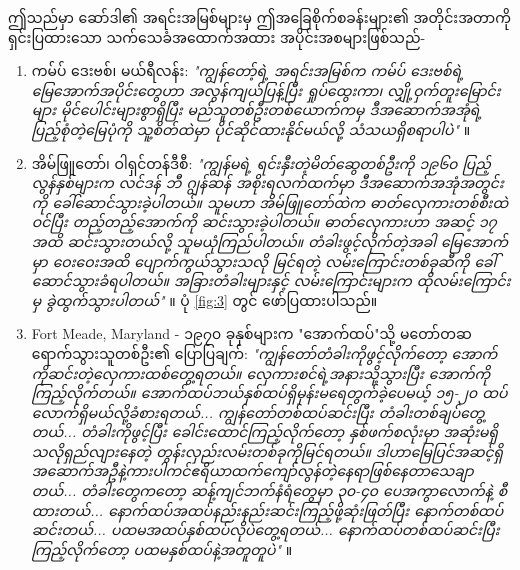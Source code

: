 \documentclass[10pt,twocolumn,letterpaper]{article}
\begin{document}
ဤသည်မှာ ဆော်ဒါ၏ အရင်းအမြစ်များမှ ဤအခြေစိုက်စခန်းများ၏ အတိုင်းအတာကို ရှင်းပြထားသော သက်သေခံအထောက်အထား အပိုင်းအစများဖြစ်သည်-
\begin{flushleft}
\begin{enumerate}
    \item ကမ်ပ် ဒေးဗစ်၊ မယ်ရီလန်း: \textit{"ကျွန်တော့်ရဲ့ အရင်းအမြစ်က ကမ်ပ် ဒေးဗစ်ရဲ့ မြေအောက်အပိုင်းတွေဟာ အလွန်ကျယ်ပြန့်ပြီး ရှုပ်ထွေးကာ၊ လျှို့ဝှက်တူးမြောင်းများ မိုင်ပေါင်းများစွာရှိပြီး မည်သူတစ်ဦးတစ်ယောက်ကမှ ဒီအဆောက်အအုံရဲ့ ပြည့်စုံတဲ့မြေပုံကို သူ့စိတ်ထဲမှာ ပိုင်ဆိုင်ထားနိုင်မယ်လို့ သံသယရှိစရာပါပဲ"} \cite{22}။
    \item အိမ်ဖြူတော်၊ ဝါရှင်တန်ဒီစီ: \textit{"ကျွန်မရဲ့ ရင်းနှီးတဲ့မိတ်ဆွေတစ်ဦးကို ၁၉၆၀ ပြည့်လွန်နှစ်များက လင်ဒန် ဘီ ဂျွန်ဆန် အစိုးရလက်ထက်မှာ ဒီအဆောက်အအုံအတွင်းကို ခေါ်ဆောင်သွားခဲ့ပါတယ်။ သူမဟာ အိမ်ဖြူတော်ထဲက ဓာတ်လှေကားတစ်စီးထဲဝင်ပြီး တည့်တည့်အောက်ကို ဆင်းသွားခဲ့ပါတယ်။ ဓာတ်လှေကားဟာ အဆင့် ၁၇ အထိ ဆင်းသွားတယ်လို့ သူမယုံကြည်ပါတယ်။ တံခါးဖွင့်လိုက်တဲ့အခါ မြေအောက်မှာ ဝေးဝေးအထိ ပျောက်ကွယ်သွားသလို မြင်ရတဲ့ လမ်းကြောင်းတစ်ခုဆီကို ခေါ်ဆောင်သွားခံရပါတယ်။ အခြားတံခါးများနှင့် လမ်းကြောင်းများက ထိုလမ်းကြောင်းမှ ခွဲထွက်သွားပါတယ်"} \cite{22}။ ပုံ \ref{fig:3} တွင် ဖော်ပြထားပါသည်။
    \item Fort Meade, Maryland - ၁၉၇၀ ခုနှစ်များက "အောက်ထပ်"သို့ မတော်တဆ ရောက်သွားသူတစ်ဦး၏ ပြောပြချက်: \textit{"ကျွန်တော်တံခါးကိုဖွင့်လိုက်တော့ အောက်ကိုဆင်းတဲ့လှေကားထစ်တွေ့ရတယ်။ လှေကားစင်ရဲ့အနားသို့သွားပြီး အောက်ကိုကြည့်လိုက်တယ်။ အောက်ထပ်ဘယ်နှစ်ထပ်ရှိမှန်းမရေတွက်ခဲ့ပေမယ့် ၁၅-၂၀ ထပ်လောက်ရှိမယ်လို့ခံစားရတယ်... ကျွန်တော်တစ်ထပ်ဆင်းပြီး တံခါးတစ်ချပ်တွေ့တယ်... တံခါးကိုဖွင့်ပြီး ခေါင်းထောင်ကြည့်လိုက်တော့ နှစ်ဖက်စလုံးမှာ အဆုံးမရှိသလိုရှည်လျားနေတဲ့ တွန်းလှည်းလမ်းတစ်ခုကိုမြင်ရတယ်။ ဒါဟာမြေပြင်အဆင့်ရှိ အဆောက်အဦနဲ့ကားပါကင်ဧရိယာထက်ကျော်လွန်တဲ့နေရာဖြစ်နေတာသေချာတယ်... တံခါးတွေကတော့ ဆန့်ကျင်ဘက်နံရံတွေမှာ ၃၀-၄၀ ပေအကွာလောက်နဲ့ စီထားတယ်... နောက်ထပ်အထပ်နည်းနည်းဆင်းကြည့်ဖို့ဆုံးဖြတ်ပြီး နောက်တစ်ထပ်ဆင်းတယ်... ပထမအထပ်နှစ်ထပ်လိုပဲတွေ့ရတယ်... နောက်ထပ်တစ်ထပ်ဆင်းပြီး ကြည့်လိုက်တော့ ပထမနှစ်ထပ်နဲ့အတူတူပဲ"} \cite{22}။
\end{enumerate}
\end{flushleft}
\end{document}
